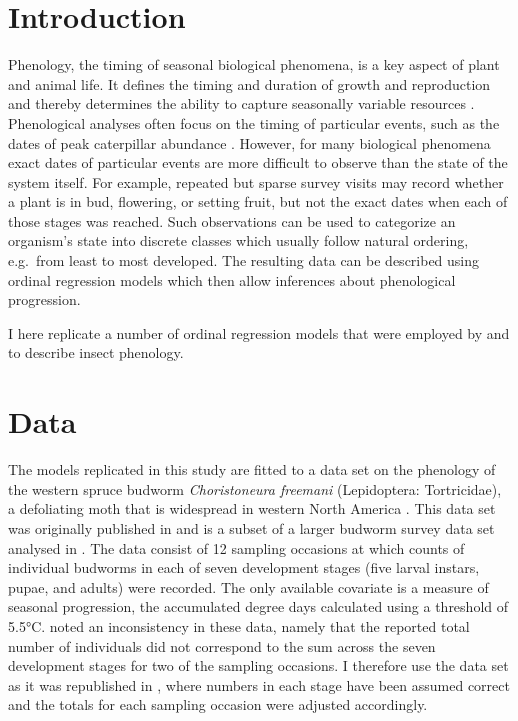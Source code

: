 \section{Introduction}

Phenology, the timing of seasonal biological phenomena, is a key aspect of plant and animal life.
It defines the timing and duration of growth and reproduction and thereby determines the ability to capture seasonally variable resources \citep{chuine2017process}.
Phenological analyses often focus on the timing of particular events, such as the dates of peak caterpillar abundance \citep{shutt2019spatial}.
However, for many biological phenomena exact dates of particular events are more difficult to observe than the state of the system itself.
For example, repeated but sparse survey visits may record whether a plant is in bud, flowering, or setting fruit, but not the exact dates when each of those stages was reached.
Such observations can be used to categorize an organism's state into discrete classes which usually follow natural ordering, e.g.\ from least to most developed. 
The resulting data can be described using ordinal regression models \cite{mccullagh1980regression,agresti2010analysis} which then allow inferences about phenological progression.

I here replicate a number of ordinal regression models that were employed by \citet{dennis1986stochastic} and \citet{candy1991modeling} to describe insect phenology. 

\section{Data}
\label{sec:data}
The models replicated in this study are fitted to a data set on the phenology of the western spruce budworm \emph{Choristoneura freemani} (Lepidoptera: Tortricidae), a defoliating moth that is widespread in western North America \citep{brookes1987western}.
This data set was originally published in \citep{dennis1986stochastic} and is a subset of a larger budworm survey data set analysed in \citep{kemp1986stochastic}. 
The data consist of 12 sampling occasions at which counts of individual budworms in each of seven development stages (five larval instars, pupae, and adults) were recorded. 
The only available covariate is a measure of seasonal progression, the accumulated degree days calculated using a threshold of 5.5°C. 
\citet{candy1991modeling} noted an inconsistency in these data, namely that the reported total number of individuals did not correspond to the sum across the seven development stages for two of the sampling occasions. 
I therefore use the data set as it was republished in \citep{candy1990biology}, where numbers in each stage have been assumed correct and the totals for each sampling occasion were adjusted accordingly.

